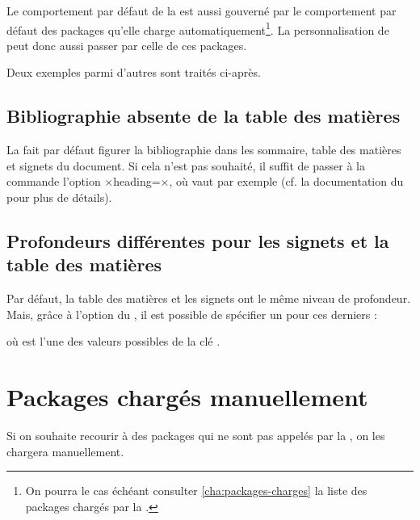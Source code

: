 
Le comportement par défaut de la \yatcl{} est aussi gouverné par le
comportement par défaut des packages qu'elle charge
automatiquement\footnote{ On pourra le cas échéant consulter
  \vref{cha:packages-charges} la liste des packages chargés par la \yatcl{}.}.
La personnalisation de \yat{} peut donc aussi passer par celle de ces
packages.

Deux exemples parmi d'autres sont traités ci-après.

\subsection{Bibliographie absente de la table des matières}

La \yatcl{} fait par défaut figurer la bibliographie dans les sommaire, table
des matières et signets du document. Si cela n'est pas souhaité, il suffit de
passer à la commande  l'option
×heading=×, où  vaut par exemple
 (cf. la documentation du  pour plus
de détails).

\subsection{Profondeurs différentes pour les signets et la table des matières}

Par défaut, la table des matières et les signets ont le même niveau de
profondeur. Mais, grâce à l'option  du
, il est possible de spécifier un  pour
ces derniers :
\begin{preamblecode}[title=Par exemple dans le \File{\configurationfile}]
\end{preamblecode}
où  est l'une des valeurs possibles de la clé
.

\section{Packages chargés manuellement}
\label{sec:options-de-classes}
Si on souhaite recourir à des packages qui ne sont pas appelés par la \yatcl{},
on les chargera manuellement.

